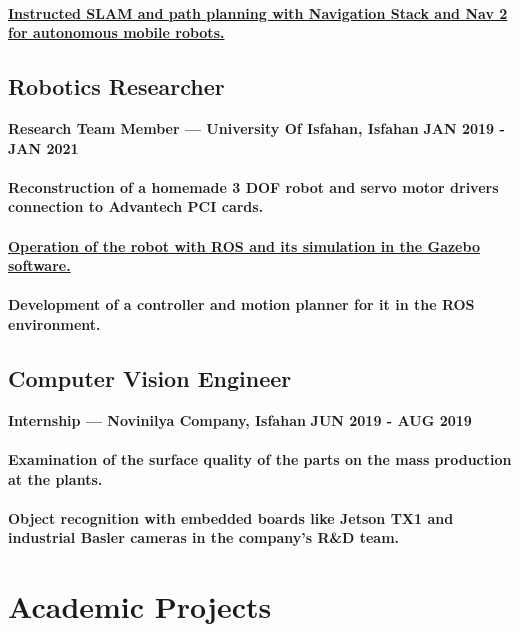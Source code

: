 \documentclass[a4paper]{article}
\begin{document}
\paragraph{\href{https://github.com/ake1999/Mobile_Robotics_Course_ROS_2023}{Instructed SLAM and path planning with Navigation Stack and Nav 2 for autonomous mobile robots.}}
\subsection{Robotics Researcher}

{\bfseries\small Research Team Member — University Of Isfahan, Isfahan}
\hfill
{\bfseries\small JAN 2019 - JAN 2021}

\paragraph{Reconstruction of a homemade 3 DOF robot and servo motor drivers connection to Advantech PCI cards.}
\paragraph{\href{https://github.com/ake1999/aarm}{Operation of the robot with ROS and its simulation in the Gazebo software.}}
\paragraph{Development of a controller and motion planner for it in the ROS environment.}
\subsection{Computer Vision Engineer}
{\bfseries\small Internship — Novinilya Company, Isfahan}
\hfill
{\bfseries\small JUN 2019 - AUG 2019}\nopagebreak
        
\paragraph{Examination of the surface quality of the parts on the mass production at the plants.}
\paragraph{Object recognition with embedded boards like Jetson TX1 and industrial Basler cameras in the company's R\&D team.}

\section{Academic Projects}
\end{document}
